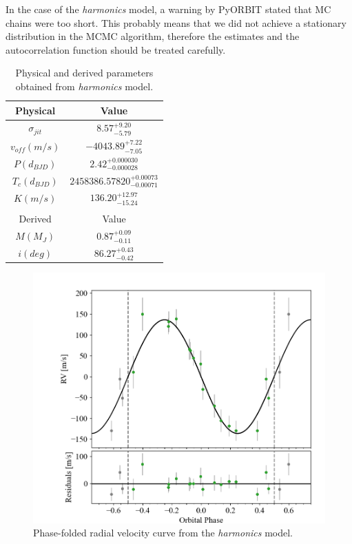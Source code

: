 \documentclass{aa}
\begin{document}
In the case of the \textit{harmonics} model, a warning by PyORBIT stated 
that MC chains were too short. This probably means that we did not 
achieve a stationary distribution in the MCMC algorithm, therefore the 
estimates and the autocorrelation function should be treated carefully.
\begin{table}[H]
    \small
	\centering
	\begin{tabular}{cc}
		\hline
		Physical & Value \\
		\hline
		$\sigma_{jit}$ & $ 8.57_{-5.79}^{+9.20} $ \\
		$v_{off} (m/s)$ & $  -4043.89_{-7.05}^{+7.22} $    \\
		$P (d_{BJD})$   & $2.42_{-0.000028}^{+0.000030}$  \\
		$T_c (d_{BJD})$  & $2458386.57820_{-0.00071 }^{+0.00073} $\\
		$K (m/s)$   & $136.20_{-15.24}^{+12.97} $  \\
        \\
        \hline
		Derived & Value \\
		\hline
        $M(M_J)$ & $0.87_{-0.11}^{+0.09}$  \\
        $i (deg)$ & $86.27_{-0.42}^{+0.43} $ \\
		\hline
	\end{tabular} 
	\caption{Physical and derived parameters obtained from \textit{harmonics} model.}
\label{table:4}
\end{table}
\begin{figure}[H]
	\centering
	\includegraphics[scale=0.25, angle=0]{pictures/RV2.png}
	\caption{Phase-folded radial velocity curve from the \textit{harmonics} model.}
	\label{fig:RV2}
\end{figure}
\end{document}
